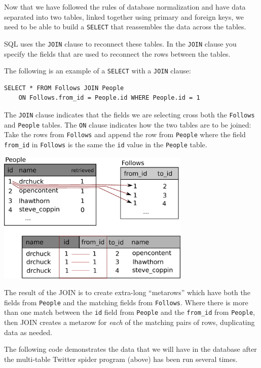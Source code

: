 Now that we have followed the rules of database normalization
and have data separated into two tables, linked together using
primary and foreign keys, we need to be able to build a 
{\tt SELECT} that reassembles the data across the tables.

SQL uses the {\tt JOIN} clause to reconnect these tables.  
In the {\tt JOIN} clause you specify the fields that are used 
to reconnect the rows between the tables.

The following is an example of a {\tt SELECT} with a 
{\tt JOIN} clause:

\beforeverb
\begin{verbatim}
SELECT * FROM Follows JOIN People 
    ON Follows.from_id = People.id WHERE People.id = 1
\end{verbatim}
\afterverb
%
The {\tt JOIN} clause indicates that the fields we are selecting
cross both the {\tt Follows} and {\tt People} tables.  The {\tt ON}
clause indicates how the two tables are to be joined:  Take the rows
from {\tt Follows} and append the row from {\tt People} where the
field \verb"from_id" in {\tt Follows} is the same the {\tt id} value
in the {\tt People} table.

\beforefig
\centerline{\includegraphics[height=2.50in]{figs2/join.eps}}
\afterfig

The result of the JOIN is to create extra-long ``metarows'' which have both 
the fields from {\tt People} and the matching fields from {\tt Follows}.
Where there is more than one match between the {\tt id} field from {\tt People}
and the \verb"from_id" from {\tt People}, then JOIN creates a metarow 
for \emph{each} of the matching pairs of rows, duplicating data as needed.

The following code demonstrates the data that we will have in the 
database after the multi-table Twitter spider program (above) has
been run several times.

